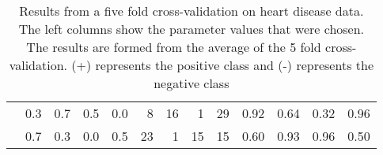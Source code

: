 \documentclass[twoside,11pt]{article}
\begin{document}
\begin{table}[htbp]
\begin{tabular}{rrrrr|rrrrrrrr}
    \multicolumn{1}{c}{} & 0.3   & 0.7   & 0.5   & 0.0   & 8     & 16    & 1     & 29    & 0.92  & 0.64  & 0.32  & 0.96 \\
    \multicolumn{1}{c}{} & 0.7   & 0.3   & 0.0   & 0.5   & 23    & 1     & 15    & 15    & 0.60  & 0.93  & 0.96  & 0.50 \bigstrut[b]\\
    \hline
    \hline
    \end{tabular}%
  \caption{Results from a five fold cross-validation on heart disease data. The left columns show the parameter values that were chosen. The results are formed from the average of the 5 fold cross-validation. (+) represents the positive class and (-) represents the negative class}
\end{table}%


\end{document}

